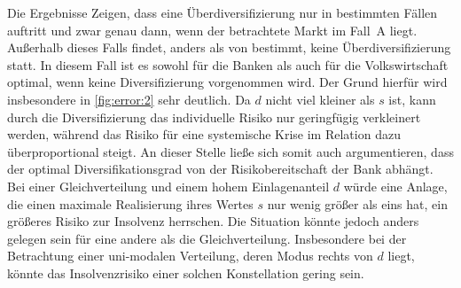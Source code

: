 Die Ergebnisse Zeigen, dass eine Überdiversifizierung nur in bestimmten Fällen auftritt und zwar genau dann, wenn der betrachtete Markt im Fall~A liegt. Außerhalb dieses Falls findet, anders als von \citeauthor{Wagner-2010} bestimmt, keine Überdiversifizierung statt. In diesem Fall ist es sowohl für die Banken als auch für die Volkswirtschaft optimal, wenn keine Diversifizierung vorgenommen wird. Der Grund hierfür wird insbesondere in \cref{fig:error:2} sehr deutlich. Da $d$ nicht viel kleiner als $s$ ist, kann durch die Diversifizierung das individuelle Risiko nur geringfügig verkleinert werden, während das Risiko für eine systemische Krise im Relation dazu überproportional steigt. An dieser Stelle ließe sich somit auch argumentieren, dass der optimal Diversifikationsgrad von der Risikobereitschaft der Bank abhängt. Bei einer Gleichverteilung und einem hohem Einlagenanteil $d$ würde eine Anlage, die einen maximale Realisierung ihres Wertes $s$ nur wenig größer als eins hat, ein größeres Risiko zur Insolvenz herrschen. Die Situation könnte jedoch anders gelegen sein für eine andere als die Gleichverteilung. Insbesondere bei der Betrachtung einer uni-modalen Verteilung, deren Modus rechts von $d$ liegt, könnte das Insolvenzrisiko einer solchen Konstellation gering sein.
